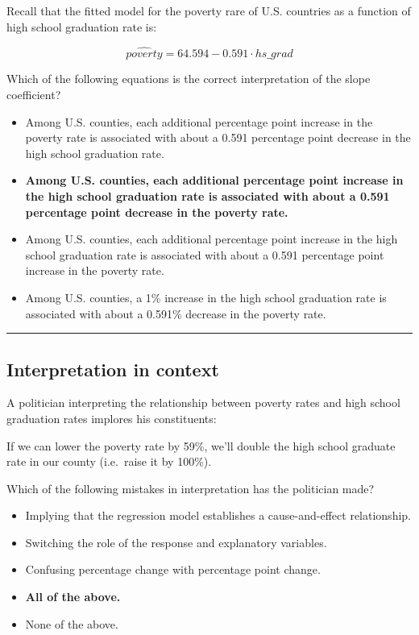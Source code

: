 \documentclass[
]{book}
\providecommand{\tightlist}{%
  \setlength{\itemsep}{0pt}\setlength{\parskip}{0pt}}
\begin{document}
Recall that the fitted model for the poverty rare of U.S. countries as a function of high school graduation rate is:

\begin{equation}
\widehat{poverty} = 64.594 - 0.591\cdot {hs\_grad}
\end{equation}

Which of the following equations is the correct interpretation of the slope coefficient?

\begin{itemize}
\tightlist
\item
  Among U.S. counties, each additional percentage point increase in the poverty rate is associated with about a 0.591 percentage point decrease in the high school graduation rate.
\item
  \textbf{Among U.S. counties, each additional percentage point increase in the high school graduation rate is associated with about a 0.591 percentage point decrease in the poverty rate.}
\item
  Among U.S. counties, each additional percentage point increase in the high school graduation rate is associated with about a 0.591 percentage point increase in the poverty rate.
\item
  Among U.S. counties, a 1\% increase in the high school graduation rate is associated with about a 0.591\% decrease in the poverty rate.
\end{itemize}

\begin{center}\rule{0.5\linewidth}{0.5pt}\end{center}

\hypertarget{interpretation-in-context}{%
\subsection*{Interpretation in context}\label{interpretation-in-context}}

A politician interpreting the relationship between poverty rates and high school graduation rates implores his constituents:

If we can lower the poverty rate by 59\%, we'll double the high school graduate rate in our county (i.e.~raise it by 100\%).

Which of the following mistakes in interpretation has the politician made?

\begin{itemize}
\item
  Implying that the regression model establishes a cause-and-effect relationship.
\item
  Switching the role of the response and explanatory variables.
\item
  Confusing percentage change with percentage point change.
\item
  \textbf{All of the above.}
\item
  None of the above.
\end{itemize}
\end{document}
